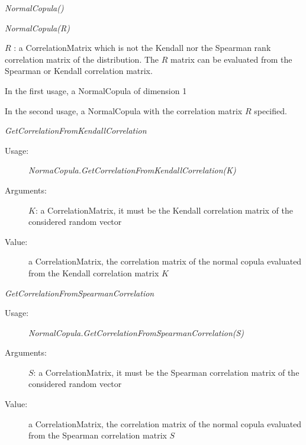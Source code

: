 \begin{description}

\item[Usage:] \rule{0pt}{1em}
\begin{description}
\item \textit{NormalCopula()}
\item \textit{NormalCopula(R)}
\end{description}

\item[Arguments:] $R$ : a CorrelationMatrix which is not the Kendall nor the Spearman rank correlation matrix of the distribution. The $R$ matrix  can be evaluated from the Spearman or Kendall correlation matrix.

\item[Value:] \rule{0pt}{1em}
\begin{description}
\item In the first usage, a NormalCopula  of dimension 1
\item In the second usage, a NormalCopula  with the correlation matrix $R$ specified.
\end{description}

\item[Some methods:]  \rule{0pt}{1em}
\begin{description}
\item \textit{GetCorrelationFromKendallCorrelation}
\begin{description}
\item[Usage:] \textit{NormaCopula.GetCorrelationFromKendallCorrelation(K)}
\item[Arguments:] $K$: a CorrelationMatrix, it must be the Kendall correlation matrix of the considered random vector
\item[Value:] a CorrelationMatrix, the correlation matrix of the normal copula evaluated from the Kendall correlation matrix $K$
\end{description}
\bigskip

\item \textit{GetCorrelationFromSpearmanCorrelation}
\begin{description}
\item[Usage:] \textit{NormalCopula.GetCorrelationFromSpearmanCorrelation(S)}
\item[Arguments:]$S$: a CorrelationMatrix, it must be the Spearman correlation matrix of the considered random vector
\item[Value:] a CorrelationMatrix, the correlation matrix of the normal copula evaluated from the Spearman correlation matrix $S$
\end{description}
\end{description}
\item[Links:]
\end{description}


